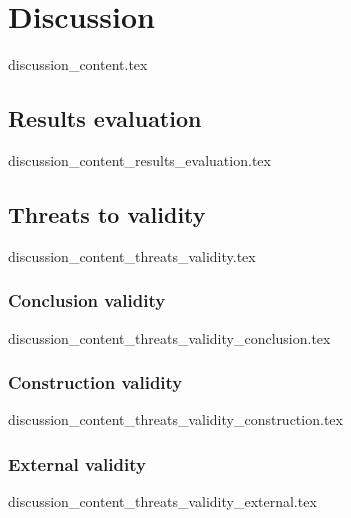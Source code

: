 \chapter{Discussion}\label{sec:discussion}
  {discussion_content.tex}

\section{Results evaluation}
  {discussion_content_results_evaluation.tex}

\section{Threats to validity}
  {discussion_content_threats_validity.tex}

\subsection{Conclusion validity}
  {discussion_content_threats_validity_conclusion.tex}

\subsection{Construction validity}
  {discussion_content_threats_validity_construction.tex}

\subsection{External validity}
  {discussion_content_threats_validity_external.tex}
